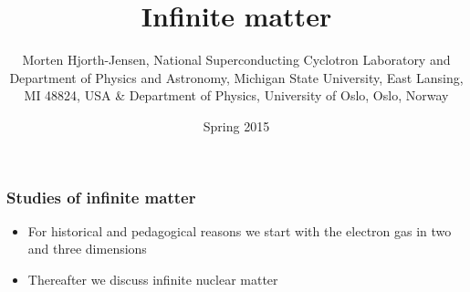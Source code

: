 \documentclass{beamer}
\begin{document}




\title{Infinite matter}


\author{Morten Hjorth-Jensen, National Superconducting Cyclotron Laboratory and Department of Physics and Astronomy, Michigan State University, East Lansing, MI 48824, USA {\&} Department of Physics, University of Oslo, Oslo, Norway\inst{}}
\institute{}

\date{Spring 2015
}

\begin{frame}
\titlepage
\end{frame}

\begin{frame}
\frametitle{Studies of infinite matter}

\begin{block}{}
\begin{itemize}
\item For historical and pedagogical  reasons we start with the electron gas in two and three dimensions 

\item Thereafter we discuss infinite nuclear matter
\end{itemize}

\noindent
\end{block}
\end{frame}
\end{document}
